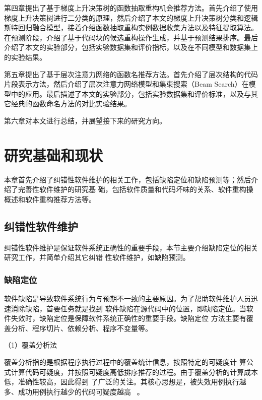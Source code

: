 第四章提出了基于梯度上升决策树的函数抽取重构机会推荐方法。首先介绍了使用梯度上升决策树进行二分类的原理，然后介绍了本文的梯度上升决策树分类和逻辑斯特回归融合模型，接着介绍函数抽取重构实例数据收集方法以及特征提取算法。在预测阶段，介绍了基于代码块的候选重构操作生成，并基于预测结果排序。最后介绍了本文的实验部分，包括实验数据集和评价指标，以及在不同模型和数据集上的实验结果。

第五章提出了基于层次注意力网络的函数名推荐方法。首先介绍了层次结构的代码片段表示方法，然后介绍了层次注意力网络模型和集束搜索（Beam Search）在模型中的应用。最后描述了本文的实验部分，包括实验数据集和评价标准，以及与其它经典的函数命名方法的对比实验结果。

第六章对本文进行总结，并展望接下来的研究方向。

\chapter{研究基础和现状}
本章首先介绍了纠错性软件维护的相关工作，包括缺陷定位和缺陷预测等；然后介绍了完善性软件维护的研究基
础，包括软件质量和代码坏味的关系、软件重构操概述和软件重构推荐方法等。
\section{纠错性软件维护}
纠错性软件维护是保证软件系统正确性的重要手段，本节主要介绍缺陷定位的相关研究工作，并简单介绍其它纠错
性软件维护，如缺陷预测。
\subsection{缺陷定位}
软件缺陷是导致软件系统行为与预期不一致的主要原因。为了帮助软件维护人员迅速消除缺陷，首要任务就是找到
软件缺陷在源代码中的位置，即缺陷定位。当软件失效时，缺陷定位是保障软件系统正确性的重要手段。缺陷定位
方法主要有覆盖分析、程序切片、依赖分析、程序不变量等。

（1）覆盖分析法

覆盖分析指的是根据程序执行过程中的覆盖统计信息，按照特定的可疑度计
算公式计算代码可疑度，并按照可疑度高低排序推荐的过程。由于覆盖分析的计算成本低，准确性较高，因此得到
了广泛的关注。其核心思想是，被失效用例执行越多、成功用例执行越少的代码可疑度越高
~\cite{jones2005empirical}。

